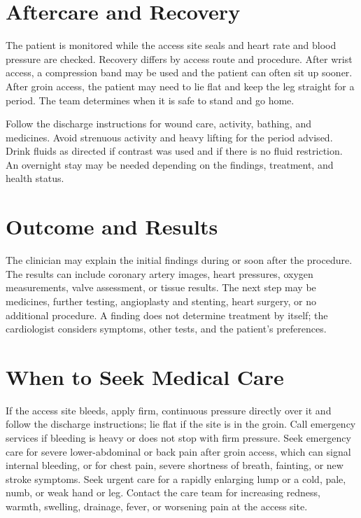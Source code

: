 \section*{Aftercare and Recovery}
The patient is monitored while the access site seals and heart rate and blood pressure are checked. Recovery differs by access route and procedure. After wrist access, a compression band may be used and the patient can often sit up sooner. After groin access, the patient may need to lie flat and keep the leg straight for a period. The team determines when it is safe to stand and go home.

Follow the discharge instructions for wound care, activity, bathing, and medicines. Avoid strenuous activity and heavy lifting for the period advised. Drink fluids as directed if contrast was used and if there is no fluid restriction. An overnight stay may be needed depending on the findings, treatment, and health status.

\section*{Outcome and Results}
The clinician may explain the initial findings during or soon after the procedure. The results can include coronary artery images, heart pressures, oxygen measurements, valve assessment, or tissue results. The next step may be medicines, further testing, angioplasty and stenting, heart surgery, or no additional procedure. A finding does not determine treatment by itself; the cardiologist considers symptoms, other tests, and the patient's preferences.

\section*{When to Seek Medical Care}
If the access site bleeds, apply firm, continuous pressure directly over it and follow the discharge instructions; lie flat if the site is in the groin. Call emergency services if bleeding is heavy or does not stop with firm pressure. Seek emergency care for severe lower-abdominal or back pain after groin access, which can signal internal bleeding, or for chest pain, severe shortness of breath, fainting, or new stroke symptoms. Seek urgent care for a rapidly enlarging lump or a cold, pale, numb, or weak hand or leg. Contact the care team for increasing redness, warmth, swelling, drainage, fever, or worsening pain at the access site.

